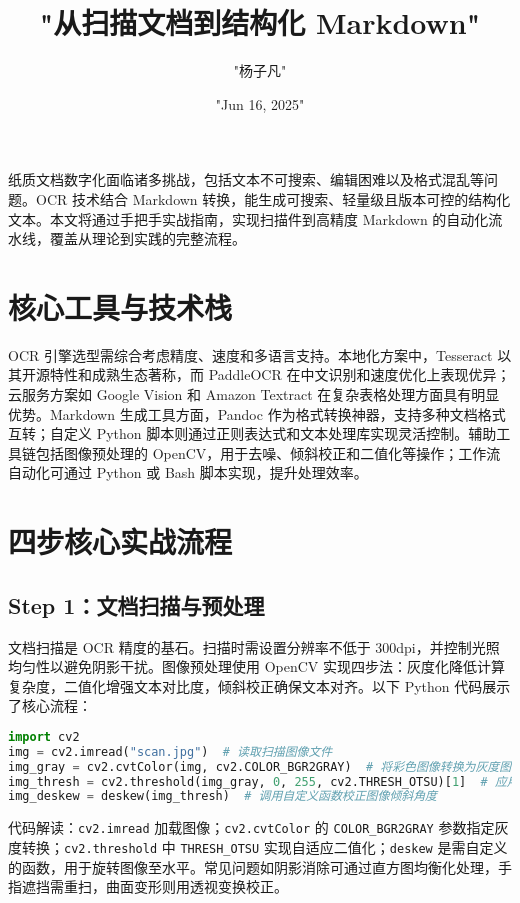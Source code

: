 \title{"从扫描文档到结构化 Markdown"}
\author{"杨子凡"}
\date{"Jun 16, 2025"}
\maketitle
纸质文档数字化面临诸多挑战，包括文本不可搜索、编辑困难以及格式混乱等问题。OCR 技术结合 Markdown 转换，能生成可搜索、轻量级且版本可控的结构化文本。本文将通过手把手实战指南，实现扫描件到高精度 Markdown 的自动化流水线，覆盖从理论到实践的完整流程。\par
\chapter{核心工具与技术栈}
OCR 引擎选型需综合考虑精度、速度和多语言支持。本地化方案中，Tesseract 以其开源特性和成熟生态著称，而 PaddleOCR 在中文识别和速度优化上表现优异；云服务方案如 Google Vision 和 Amazon Textract 在复杂表格处理方面具有明显优势。Markdown 生成工具方面，Pandoc 作为格式转换神器，支持多种文档格式互转；自定义 Python 脚本则通过正则表达式和文本处理库实现灵活控制。辅助工具链包括图像预处理的 OpenCV，用于去噪、倾斜校正和二值化等操作；工作流自动化可通过 Python 或 Bash 脚本实现，提升处理效率。\par
\chapter{四步核心实战流程}
\section{Step 1：文档扫描与预处理}
文档扫描是 OCR 精度的基石。扫描时需设置分辨率不低于 300dpi，并控制光照均匀性以避免阴影干扰。图像预处理使用 OpenCV 实现四步法：灰度化降低计算复杂度，二值化增强文本对比度，倾斜校正确保文本对齐。以下 Python 代码展示了核心流程：\par
\begin{lstlisting}[language=python]
import cv2
img = cv2.imread("scan.jpg")  # 读取扫描图像文件
img_gray = cv2.cvtColor(img, cv2.COLOR_BGR2GRAY)  # 将彩色图像转换为灰度图像，减少通道数
img_thresh = cv2.threshold(img_gray, 0, 255, cv2.THRESH_OTSU)[1]  # 应用大津算法自动阈值二值化
img_deskew = deskew(img_thresh)  # 调用自定义函数校正图像倾斜角度
\end{lstlisting}
代码解读：\texttt{cv2.imread} 加载图像；\texttt{cv2.cvtColor} 的 \texttt{COLOR\_{}BGR2GRAY} 参数指定灰度转换；\texttt{cv2.threshold} 中 \texttt{THRESH\_{}OTSU} 实现自适应二值化；\texttt{deskew} 是需自定义的函数，用于旋转图像至水平。常见问题如阴影消除可通过直方图均衡化处理，手指遮挡需重扫，曲面变形则用透视变换校正。\par
